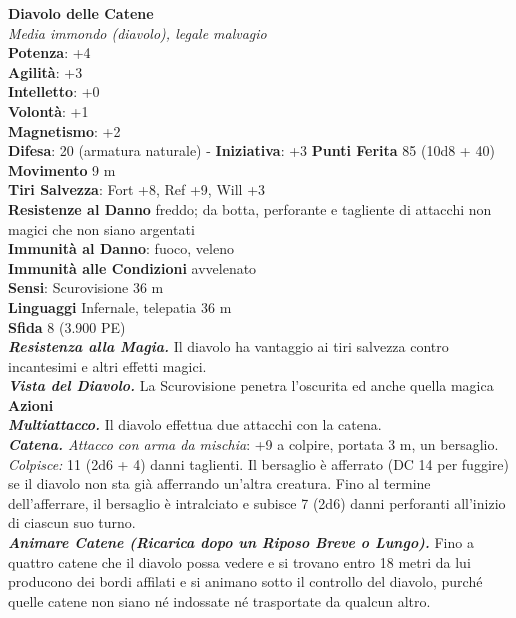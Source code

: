 \begin{multicols}{2}
\medskip\textbf{Diavolo delle Catene}\\
\emph{Media immondo (diavolo), legale malvagio}\\
\textbf{Potenza}: +4\\
\textbf{Agilità}: +3\\
\textbf{Intelletto}: +0\\
\textbf{Volontà}: +1\\
\textbf{Magnetismo}: +2\\
\textbf{Difesa}: 20 (armatura naturale) - \textbf{Iniziativa}: +3
\textbf{Punti Ferita} 85 (10d8 + 40)\\
\textbf{Movimento} 9 m\\
\textbf{Tiri Salvezza}: Fort +8, Ref +9, Will +3\\
\textbf{Resistenze al Danno} freddo; da botta, perforante e tagliente di attacchi non magici che non siano argentati\\
\textbf{Immunità al Danno}: fuoco, veleno\\
\textbf{Immunità alle Condizioni} avvelenato\\
\textbf{Sensi}: Scurovisione 36 m\\
\textbf{Linguaggi} Infernale, telepatia 36 m \\
\textbf{Sfida} 8 (3.900 PE)\smallskip\\
\emph{\textbf{Resistenza alla Magia.}} Il diavolo ha vantaggio ai tiri salvezza contro incantesimi e altri effetti magici.\\
\emph{\textbf{Vista del Diavolo.}} La Scurovisione penetra l'oscurita ed anche quella magica\\
\smallskip\textbf{Azioni}\\
\emph{\textbf{Multiattacco.}} Il diavolo effettua due attacchi con la catena.\\
\emph{\textbf{Catena.} Attacco con arma da mischia}: +9 a colpire, portata 3 m, un bersaglio.\\
\emph{Colpisce:} 11 (2d6 + 4) danni taglienti. Il bersaglio è afferrato (DC 14 per fuggire) se il diavolo non sta già afferrando un'altra creatura. Fino al termine dell'afferrare, il bersaglio è intralciato e subisce 7 (2d6) danni perforanti all'inizio di ciascun suo turno.\\
\emph{\textbf{Animare Catene (Ricarica dopo un Riposo Breve o Lungo).}} Fino a quattro catene che il diavolo possa vedere e si trovano entro 18 metri da lui producono dei bordi affilati e si animano sotto il controllo del diavolo, purché quelle catene non siano né indossate né trasportate da qualcun altro.\\

\end{multicols}
